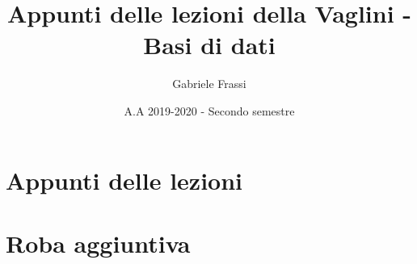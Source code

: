 \documentclass[11pt]{report}
\theoremstyle{definition}
\begin{document}
	\title{\textbf{Appunti delle lezioni della Vaglini - Basi di dati}}
	\author{Gabriele Frassi}
	\date{A.A 2019-2020 - Secondo semestre}
	\maketitle

	
	
	\tableofcontents

	

	\part{Appunti delle lezioni}
	
	
	
	
	
	
	
	
	
	
	
	
	

	\appendix
	
	\part{Roba aggiuntiva}
	
	
	
	
\end{document}
